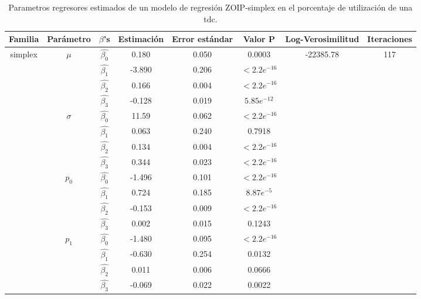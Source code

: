 \begin{table}[!hbt]
{\scriptsize
\begin{center}
\begin{tabular}{|c|c|c|ccc|c|c|}\hline
Familia & Par\'{a}metro & $\beta$'s & Estimaci\'{o}n & Error est\'{a}ndar & Valor P & Log-Verosimilitud & Iteraciones \\ \hline \hline
\multirow{12}{*}{simplex} & \multirow{4}{*}{$\mu$} & $\hat{\beta_0}$ & 0.180	&0.050	&0.0003  & \multirow{12}{*}{-22385.78} & \multirow{12}{*}{117} \\
& & $\hat{\beta_1}$ & -3.890	&0.206	&$<2.2e^{-16}$   & &\\
& & $\hat{\beta_2}$ & 0.166	&0.004	&$<2.2e^{-16}$   & &\\
& & $\hat{\beta_3}$ & -0.128	&0.019	&$5.85e^{-12}$   & &\\ \cline{2-6}
& \multirow{4}{*}{$\sigma$} & $\hat{\beta_0}$ & 11.59	&0.062	&$<2.2e^{-16}$   & &\\
& & $\hat{\beta_1}$ & 0.063	&0.240	&0.7918   & &\\
& & $\hat{\beta_2}$ & 0.134	&0.004	&$<2.2e^{-16}$  & &\\
& & $\hat{\beta_3}$ & 0.344	&0.023	&$<2.2e^{-16}$   & &\\ \cline{2-6}
& \multirow{4}{*}{$p_0$} & $\hat{\beta_0}$ & -1.496	&0.101	&$<2.2e^{-16}$  & &\\
& & $\hat{\beta_1}$ & 0.724	&0.185	&$8.87e^{-5}$  & &\\
& & $\hat{\beta_2}$ & -0.153	&0.009	&$<2.2e^{-16}$  & &\\
& & $\hat{\beta_3}$ & 0.002	&0.015	&0.1243  & &\\ \cline{2-6}
& \multirow{4}{*}{$p_1$} & $\hat{\beta_0}$ &-1.480	&0.095	&$<2.2e^{-16}$  & &\\
& & $\hat{\beta_1}$ & -0.630	&0.254	&0.0132  & &\\
& & $\hat{\beta_2}$ & 0.011	&0.006	&0.0666  & &\\
& & $\hat{\beta_3}$ & -0.069	&0.022	&0.0022  & &\\ \hline

\end{tabular}
\caption{Parametros regresores estimados de un modelo de regresi\'{o}n ZOIP-simplex en el porcentaje de utilizaci\'{o}n de una tdc.}
\label{T_Apli_CC_Sim}
\end{center}
}
\end{table}

